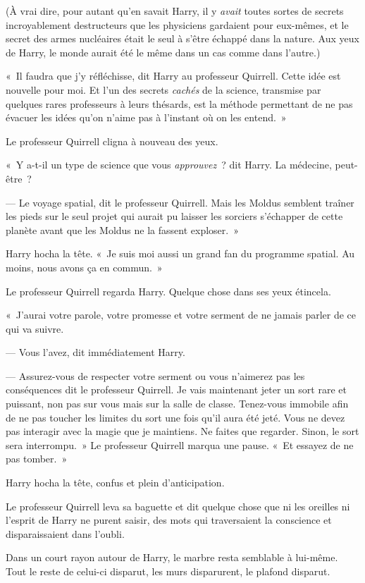 (À vrai dire, pour autant qu'en savait Harry, il y \emph{avait} toutes sortes de secrets incroyablement destructeurs que les physiciens gardaient pour eux-mêmes, et le secret des armes nucléaires était le seul à s'être échappé dans la nature.
Aux yeux de Harry, le monde aurait été le même dans un cas comme dans l'autre.)

«~Il faudra que j'y réfléchisse, dit Harry au professeur Quirrell.
Cette idée est nouvelle pour moi.
Et l'un des secrets \emph{cachés} de la science, transmise par quelques rares professeurs à leurs thésards, est la méthode permettant de ne pas évacuer les idées qu'on n'aime pas à l'instant où on les entend.~»

Le professeur Quirrell cligna à nouveau des yeux.

«~Y a-t-il un type de science que vous \emph{approuvez}~? dit Harry.
La médecine, peut-être~?

--- Le voyage spatial, dit le professeur Quirrell.
Mais les Moldus semblent traîner les pieds sur le seul projet qui aurait pu laisser les sorciers s'échapper de cette planète avant que les Moldus ne la fassent exploser.~»

Harry hocha la tête.
«~Je suis moi aussi un grand fan du programme spatial.
Au moins, nous avons ça en commun.~»

Le professeur Quirrell regarda Harry.
Quelque chose dans ses yeux étincela.

«~J'aurai votre parole, votre promesse et votre serment de ne jamais parler de ce qui va suivre.

--- Vous l'avez, dit immédiatement Harry.

--- Assurez-vous de respecter votre serment ou vous n'aimerez pas les conséquences dit le professeur Quirrell.
Je vais maintenant jeter un sort rare et puissant, non pas sur vous mais sur la salle de classe.
Tenez-vous immobile afin de ne pas toucher les limites du sort une fois qu'il aura été jeté.
Vous ne devez pas interagir avec la magie que je maintiens.
Ne faites que regarder.
Sinon, le sort sera interrompu.~»
Le professeur Quirrell marqua une pause.
«~Et essayez de ne pas tomber.~»

Harry hocha la tête, confus et plein d'anticipation.

Le professeur Quirrell leva sa baguette et dit quelque chose que ni les oreilles ni l'esprit de Harry ne purent saisir, des mots qui traversaient la conscience et disparaissaient dans l'oubli.

Dans un court rayon autour de Harry, le marbre resta semblable à lui-même.
Tout le reste de celui-ci disparut, les murs disparurent, le plafond disparut.

